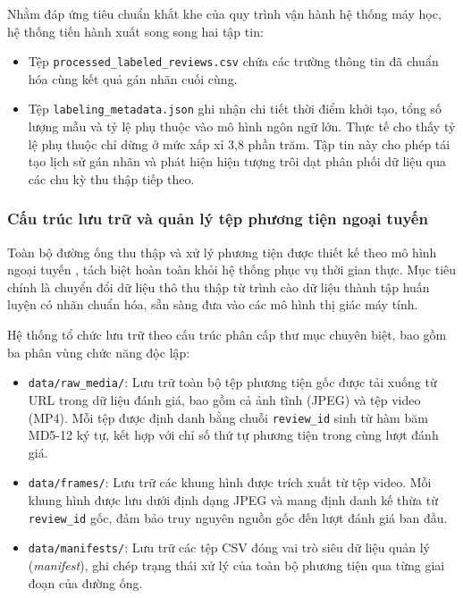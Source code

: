 Nhằm đáp ứng tiêu chuẩn khắt khe của quy trình vận hành hệ thống máy học, hệ thống tiến hành xuất song song hai tập tin:

\begin{itemize}[labelsep=10pt, leftmargin=2cm]
    \item Tệp \texttt{processed\_labeled\_reviews.csv} chứa các trường thông tin đã chuẩn hóa cùng kết quả gán nhãn cuối cùng.
    \item Tệp \texttt{labeling\_metadata.json} ghi nhận chi tiết thời điểm khởi tạo, tổng số lượng mẫu và tỷ lệ phụ thuộc vào mô hình ngôn ngữ lớn. Thực tế cho thấy tỷ lệ phụ thuộc chỉ dừng ở mức xấp xỉ 3,8 phần trăm. Tập tin này cho phép tái tạo lịch sử gán nhãn và phát hiện hiện tượng trôi dạt phân phối dữ liệu qua các chu kỳ thu thập tiếp theo.
\end{itemize}



\subsubsection{Cấu trúc lưu trữ và quản lý tệp phương tiện ngoại tuyến}

Toàn bộ đường ống thu thập và xử lý phương tiện được thiết kế theo mô hình ngoại tuyến
, tách biệt hoàn toàn khỏi hệ thống phục vụ thời gian thực.
Mục tiêu chính là chuyển đổi dữ liệu thô thu thập từ trình cào dữ liệu thành tập huấn
luyện có nhãn chuẩn hóa, sẵn sàng đưa vào các mô hình thị giác máy tính.

Hệ thống tổ chức lưu trữ theo cấu trúc phân cấp thư mục chuyên biệt, bao gồm ba phân
vùng chức năng độc lập:

\begin{itemize}
    \item \texttt{data/raw\_media/}: Lưu trữ toàn bộ tệp phương tiện gốc được tải xuống
    từ URL trong dữ liệu đánh giá, bao gồm cả ảnh tĩnh (JPEG) và tệp video (MP4).
    Mỗi tệp được định danh bằng chuỗi \texttt{review\_id} sinh từ hàm băm MD5-12 ký tự,
    kết hợp với chỉ số thứ tự phương tiện trong cùng lượt đánh giá.

    \item \texttt{data/frames/}: Lưu trữ các khung hình được trích xuất từ tệp video.
    Mỗi khung hình được lưu dưới định dạng JPEG và mang định danh kế thừa từ
    \texttt{review\_id} gốc, đảm bảo truy nguyên nguồn gốc đến lượt đánh giá ban đầu.

    \item \texttt{data/manifests/}: Lưu trữ các tệp CSV đóng vai trò siêu dữ liệu quản
    lý (\textit{manifest}), ghi chép trạng thái xử lý của toàn bộ phương tiện qua từng
    giai đoạn của đường ống.
\end{itemize}

